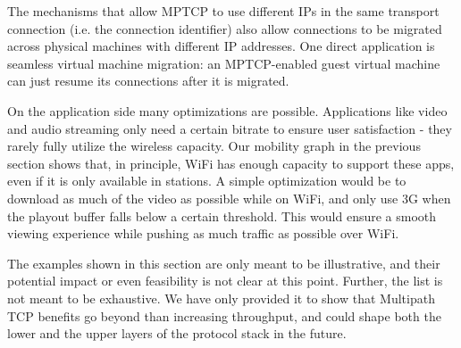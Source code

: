 The mechanisms that allow MPTCP to use different IPs in the same transport connection (i.e. the connection identifier) 
also allow connections to be migrated across physical machines with different IP addresses. One direct application is seamless virtual
machine migration: an MPTCP-enabled guest virtual machine can just resume its connections after it is migrated.

On the application side many optimizations are possible. Applications like video
and audio streaming only need a certain bitrate to ensure user satisfaction - they rarely fully utilize the wireless capacity.
Our mobility graph in the previous section shows that, in principle, WiFi has enough capacity to support these apps, even if it is 
only available in stations. A simple optimization would be to download as much of the video as possible while on WiFi, and only
use 3G when the playout buffer falls below a certain threshold. This would ensure a smooth viewing experience while pushing as 
much traffic as possible over WiFi. 

The examples shown in this section are only meant to be illustrative, and their potential impact or even feasibility 
is not clear at this point. Further, the list is not meant to be exhaustive. 
We have only provided it to show that Multipath TCP benefits go beyond than
increasing throughput, and could shape both the lower and the upper layers of the protocol stack in the future.
